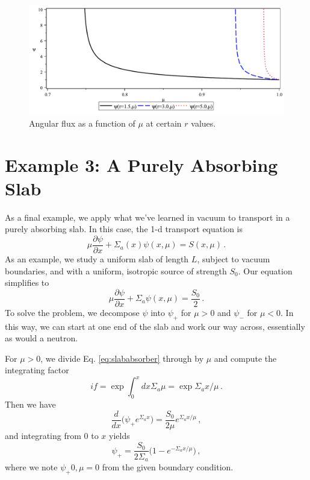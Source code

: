 \begin{figure}[ht] 
    \centering
    \includegraphics[keepaspectratio, width = 5.0 in]{sphere_psi_mu}
    \caption{Angular flux as a function of $\mu$ at certain $r$ values.}
    \label{fig:sphere_psi_mu}
\end{figure}

\section*{Example 3: A Purely Absorbing Slab}

As a final example, we apply what we've learned in vacuum to transport in a purely absorbing slab.  In this case, the 1-d transport equation is
\begin{equation}
 \mu \frac{\partial \psi}{\partial x} + \Sigma_a(x)\psi(x,\mu) = S(x,\mu) \, .
\end{equation}
As an example, we study a uniform slab of length $L$, subject to vacuum boundaries, and with a uniform, isotropic source of strength $S_0$.  Our equation simplifies to 
\begin{equation}
 \mu \frac{\partial \psi}{\partial x} + \Sigma_a \psi(x,\mu) = \frac{S_0}{2} \, .
 \label{eq:slababsorber}
\end{equation}
To solve the problem, we decompose $\psi$ into $\psi_+$ for $\mu > 0$ and $\psi_-$ for $\mu < 0$.  In this way, we can start at one end of the slab and work our way across, essentially as would a neutron.

For $\mu>0$, we divide Eq. \ref{eq:slababsorber} through by $\mu$ and compute the integrating factor
\begin{equation}
 if = \exp{\int^x_0 dx \Sigma_a\mu} = \exp{\Sigma_a x/\mu} \, .
\end{equation}
Then we have
\begin{equation}
 \frac{d}{dx}\Big ( \psi_{+} e^{\Sigma_a x} \Big ) = \frac{S_0}{2\mu}  e^{\Sigma_a x/\mu} \, ,
\end{equation}
and integrating from $0$ to $x$ yields
\begin{equation}
 \psi_{+} = \frac{S_0}{2\Sigma_a}\Bigg (1 - e^{-\Sigma_a x/\mu} \Bigg ) \, ,
\end{equation}
where we note $\psi_+{0,\mu} = 0$ from the given boundary condition.

